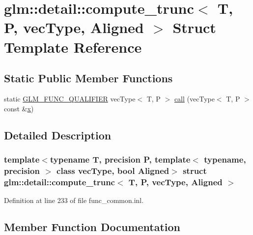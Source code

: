 \hypertarget{structglm_1_1detail_1_1compute__trunc}{}\section{glm\+::detail\+::compute\+\_\+trunc$<$ T, P, vec\+Type, Aligned $>$ Struct Template Reference}
\label{structglm_1_1detail_1_1compute__trunc}
\subsection*{Static Public Member Functions}
\begin{DoxyCompactItemize}
\item 
static \mbox{\hyperlink{setup_8hpp_a33fdea6f91c5f834105f7415e2a64407}{G\+L\+M\+\_\+\+F\+U\+N\+C\+\_\+\+Q\+U\+A\+L\+I\+F\+I\+ER}} vec\+Type$<$ T, P $>$ \mbox{\hyperlink{structglm_1_1detail_1_1compute__trunc_ae7b2394f1435078d22b8743b1b2725c9}{call}} (vec\+Type$<$ T, P $>$ const \&\mbox{\hyperlink{glad_8h_a92d0386e5c19fb81ea88c9f99644ab1d}{x}})
\end{DoxyCompactItemize}


\subsection{Detailed Description}
\subsubsection*{template$<$typename T, precision P, template$<$ typename, precision $>$ class vec\+Type, bool Aligned$>$\newline
struct glm\+::detail\+::compute\+\_\+trunc$<$ T, P, vec\+Type, Aligned $>$}



Definition at line 233 of file func\+\_\+common.\+inl.



\subsection{Member Function Documentation}
\mbox{\label{structglm_1_1detail_1_1compute__trunc_ae7b2394f1435078d22b8743b1b2725c9}} 
